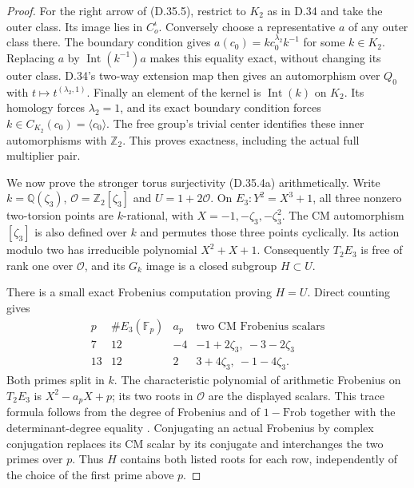 \begin{proof}
For the right arrow of (D.35.5), restrict to $K_2$ as in D.34 and
take the outer class. Its image lies in $C_o^{\iota}$. Conversely
choose a representative $a$ of any outer class there. The boundary
condition gives $a(c_0)=kc_0^{\lambda_2}k^{-1}$ for some $k\in K_2$.
Replacing $a$ by $\operatorname{Int}(k^{-1})a$ makes this equality
exact, without changing its outer class. D.34's two-way extension
map then gives an automorphism over $Q_0$ with
$t\mapsto t^{(\lambda_2,1)}$. Finally an element of the kernel is
$\operatorname{Int}(k)$ on $K_2$. Its homology forces
$\lambda_2=1$, and its exact boundary condition forces
$k\in C_{K_2}(c_0)=\langle c_0\rangle$. The free group's trivial
center identifies these inner automorphisms with $\mathbb Z_2$.
This proves exactness, including the actual full multiplier pair.

We now prove the stronger torus surjectivity (D.35.4a) arithmetically.
Write $k=\mathbb Q(\zeta_3)$, $\mathcal O=\mathbb Z_2[\zeta_3]$
and $U=1+2\mathcal O$. On $E_3:Y^2=X^3+1$, all three nonzero
two-torsion points are $k$-rational, with $X=-1,-\zeta_3,-\zeta_3^2$.
The CM automorphism $[\zeta_3]$ is also defined over $k$ and
permutes those three points cyclically. Its action modulo two has
irreducible polynomial $X^2+X+1$. Consequently $T_2E_3$ is free of
rank one over $\mathcal O$, and its $G_k$ image is a closed subgroup
$H\subset U$.

There is a small exact Frobenius computation proving $H=U$.
Direct counting gives
\[
 \begin{array}{c|c|c|c}
 p&\#E_3(\mathbb F_p)&a_p&\text{two CM Frobenius scalars}\\\hline
 7&12&-4&-1+2\zeta_3,\ -3-2\zeta_3\\
 13&12&2&3+4\zeta_3,\ -1-4\zeta_3.
 \end{array}                                         \tag{D.35.13}
\]
Both primes split in $k$. The characteristic polynomial of arithmetic
Frobenius on $T_2E_3$ is $X^2-a_pX+p$; its two roots in
$\mathcal O$ are the displayed scalars. This trace formula follows
from the degree of Frobenius and of $1-\mathrm{Frob}$ together with
the determinant-degree equality
\cite[II, Proposition 6.4; IV, Proposition 9.1 and the proof of
Theorem 9.4; V, Proposition 8.1]{dMilneEC2021}.
Conjugating an actual Frobenius by complex conjugation replaces its
CM scalar by its conjugate and interchanges the two primes over $p$.
Thus $H$ contains both listed roots for each row, independently of
the choice of the first prime above $p$.


\end{proof}
